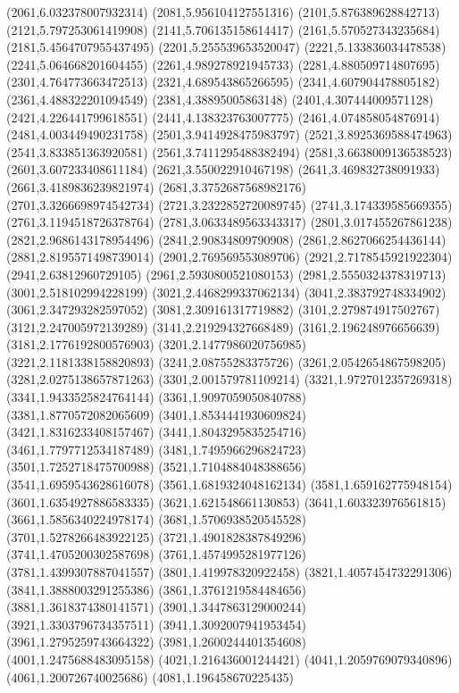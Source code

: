 {(2061,6.032378007932314)
(2081,5.956104127551316)
(2101,5.876389628842713)
(2121,5.797253061419908)
(2141,5.706135158614417)
(2161,5.570527343235684)
(2181,5.4564707955437495)
(2201,5.255539653520047)
(2221,5.133836034478538)
(2241,5.064668201604455)
(2261,4.989278921945733)
(2281,4.880509714807695)
(2301,4.764773663472513)
(2321,4.689543865266595)
(2341,4.607904478805182)
(2361,4.488322201094549)
(2381,4.38895005863148)
(2401,4.307444009571128)
(2421,4.226441799618551)
(2441,4.138323763007775)
(2461,4.074858054876914)
(2481,4.003449490231758)
(2501,3.9414928475983797)
(2521,3.8925369588474963)
(2541,3.833851363920581)
(2561,3.7411295488382494)
(2581,3.6638009136538523)
(2601,3.607233408611184)
(2621,3.550022910467198)
(2641,3.469832738091933)
(2661,3.4189836239821974)
(2681,3.3752687568982176)
(2701,3.3266698974542734)
(2721,3.2322852720089745)
(2741,3.174339585669355)
(2761,3.1194518726378764)
(2781,3.0633489563343317)
(2801,3.017455267861238)
(2821,2.9686143178954496)
(2841,2.90834809790908)
(2861,2.8627066254436144)
(2881,2.8195571498739014)
(2901,2.769569553089706)
(2921,2.7178545921922304)
(2941,2.63812960729105)
(2961,2.5930800521080153)
(2981,2.5550324378319713)
(3001,2.518102994228199)
(3021,2.4468299337062134)
(3041,2.383792748334902)
(3061,2.347293282597052)
(3081,2.309161317719882)
(3101,2.279874917502767)
(3121,2.247005972139289)
(3141,2.219294327668489)
(3161,2.196248976656639)
(3181,2.1776192800576903)
(3201,2.1477986020756985)
(3221,2.1181338158820893)
(3241,2.08755283375726)
(3261,2.0542654867598205)
(3281,2.0275138657871263)
(3301,2.001579781109214)
(3321,1.9727012357269318)
(3341,1.9433525824764144)
(3361,1.9097059050840788)
(3381,1.8770572082065609)
(3401,1.8534441930609824)
(3421,1.8316233408157467)
(3441,1.8043295835254716)
(3461,1.7797712534187489)
(3481,1.7495966296824723)
(3501,1.7252718475700988)
(3521,1.7104884048388656)
(3541,1.6959543628616078)
(3561,1.6819324048162134)
(3581,1.659162775948154)
(3601,1.6354927886583335)
(3621,1.621548661130853)
(3641,1.603323976561815)
(3661,1.5856340224978174)
(3681,1.5706938520545528)
(3701,1.5278266483922125)
(3721,1.4901828387849296)
(3741,1.4705200302587698)
(3761,1.4574995281977126)
(3781,1.4399307887041557)
(3801,1.419978320922458)
(3821,1.4057454732291306)
(3841,1.3888003291255386)
(3861,1.3761219584484656)
(3881,1.3618374380141571)
(3901,1.3447863129000244)
(3921,1.3303796734357511)
(3941,1.3092007941953454)
(3961,1.2795259743664322)
(3981,1.2600244401354608)
(4001,1.2475688483095158)
(4021,1.216436001244421)
(4041,1.2059769079340896)
(4061,1.200726740025686)
(4081,1.196458670225435)
}
